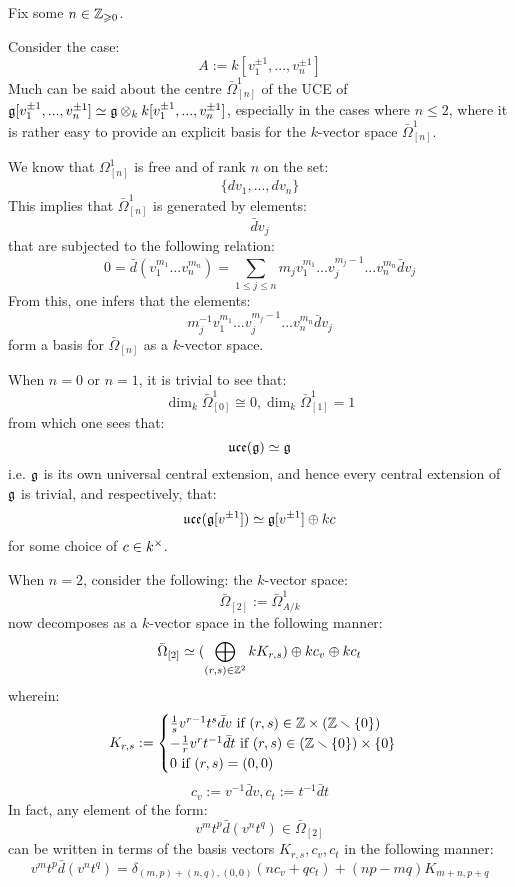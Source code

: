         \begin{example}
            Fix some $n \in \mathbb{Z}_{\geqslant 0}$.
        
            Consider the case:
                $$A := k[v_1^{\pm 1}, ..., v_n^{\pm 1}]$$
            Much can be said about the centre $\bar{\Omega}^1_{[n]}$ of the UCE of $\g[v_1^{\pm 1}, ..., v_n^{\pm 1}] \cong \g \tensor_k k[v_1^{\pm 1}, ..., v_n^{\pm 1}]$, especially in the cases where $n \leq 2$, where it is rather easy to provide an explicit basis for the $k$-vector space $\bar{\Omega}^1_{[n]}$. 

            We know that $\Omega^1_{[n]}$ is free and of rank $n$ on the set:
                $$\{dv_1, ..., dv_n\}$$
            This implies that $\bar{\Omega}^1_{[n]}$ is generated by elements:
                $$\bar{d}v_j$$
            that are subjected to the following relation:
                $$0 = \bar{d}( v_1^{m_1} ... v_n^{m_n} ) = \sum_{1 \leq j \leq n} m_j v_1^{m_1} ... v_j^{m_j - 1} ... v_n^{m_n} \bar{d}v_j$$
            From this, one infers that the elements:
                $$m_j^{-1} v_1^{m_1} ... v_j^{m_j - 1} ... v_n^{m_n} \bar{d}v_j$$
            form a basis for $\bar{\Omega}_{[n]}$ as a $k$-vector space.

            When $n = 0$ or $n = 1$, it is trivial to see that:
                $$\dim_k \bar{\Omega}^1_{[0]} \cong 0, \dim_k \bar{\Omega}^1_{[1]} = 1$$
            from which one sees that:
                $$\mathfrak{uce}(\mathfrak{g}) \simeq \mathfrak{g}$$
            i.e. $\mathfrak{g}$ is its own universal central extension, and hence every central extension of $\mathfrak{g}$ is trivial, and respectively, that:
                $$\mathfrak{uce}(\mathfrak{g}[v^{\pm 1}]) \simeq \mathfrak{g}[v^{\pm 1}] \oplus k c$$
            for some choice of $c \in k^{\x}$. 

            When $n = 2$, consider the following: the $k$-vector space:
                $$\bar{\Omega}_{[2]} := \bar{\Omega}^1_{A/k}$$
            now decomposes as a $k$-vector space in the following manner:
                $$\bar{\Omega}_{[2]} \simeq ( \bigoplus_{(r, s) \in \mathbb{Z}^2} k K_{r, s}) \oplus k c_v \oplus k c_t$$
            wherein:
                $$
                    K_{r, s} :=
                    \begin{cases}
                        \text{$\frac1s v^{r - 1} t^s \bar{d}v$ if $(r, s) \in \Z \x (\Z \setminus \{0\})$}
                        \\
                        \text{$-\frac1r v^r t^{-1} \bar{d}t$ if $(r, s) \in (\Z \setminus \{0\}) \x \{0\}$}
                        \\
                        \text{$0$ if $(r, s) = (0, 0)$}
                    \end{cases}
                $$
                $$c_v := v^{-1} \bar{d}v, c_t := t^{-1} \bar{d}t$$
            In fact, any element of the form:
                $$v^m t^p \bar{d}(v^n t^q) \in \bar{\Omega}_{[2]}$$
            can be written in terms of the basis vectors $K_{r, s}, c_v, c_t$ in the following manner:
                $$v^m t^p \bar{d}(v^n t^q) = \delta_{(m, p) + (n, q), (0, 0)} ( n c_v + q c_t ) + (np - mq) K_{m + n, p + q}$$
        \end{example}
